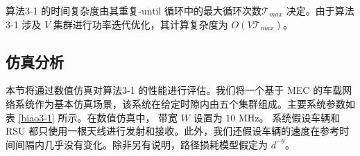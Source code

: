 \vspace*{0.25cm}%
算法3-1 的时间复杂度由其重复-until 循环中的最大循环次数$\mathcal{T}_{max}$ 决定。由于算法3-1 涉及 $V$ 集群进行功率迭代优化，其计算复杂度为 $O(V\mathcal{T}_{max})$。

\subsection{仿真分析}\label{section3-4-2}
本节将通过数值仿真对算法3-1 的性能进行评估。我们将一个基于 MEC 的车载网络系统作为基本仿真场景，该系统在给定时隙内由五个集群组成。主要系统参数如表 \ref{biao3-1} 所示。在数值仿真中，
带宽 $W$ 设置为 10 MHz。 系统假设车辆和 RSU 都只使用一根天线进行发射和接收。此外，我们还假设车辆的速度在参考时间间隔内几乎没有变化。除非另有说明，路径损耗模型假定为 $d^{-\theta}$。

